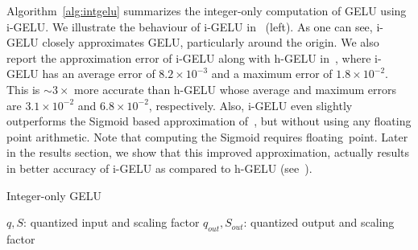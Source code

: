 Algorithm~\ref{alg:intgelu} summarizes the integer-only computation of GELU using i-GELU.
We illustrate the behaviour of i-GELU in~ (left). As one
can see, i-GELU closely approximates GELU, particularly around the origin.
We also report the approximation error of i-GELU along with h-GELU
in~, where i-GELU has an
average error of $8.2 \times 10^{-3}$ and a maximum error of $1.8 \times 10^{-2}$.
This is $\sim3\times$ more accurate than h-GELU whose average and maximum errors are $3.1 \times 10^{-2}$ and $6.8 \times 10^{-2}$, respectively.
Also, i-GELU even slightly outperforms the Sigmoid based approximation of~, but without using any floating point
arithmetic. 
Note that computing the Sigmoid requires floating~point.
Later in the results section, we show that this improved approximation, actually
results in better accuracy of i-GELU as compared to h-GELU (see~).
 


\begin{algorithm}[tb]
\caption{\footnotesize
Integer-only GELU }
\label{alg:intgelu}
\small
\begin{algorithmic}
 $q, S$: quantized input and scaling factor  
 $q_{out}, S_{out}$: quantized output and scaling factor 
\vskip 0.075in
\ENDFUNCTION
 
\vskip 0.075in
\ENDFUNCTION
\end{algorithmic}
\end{algorithm}


